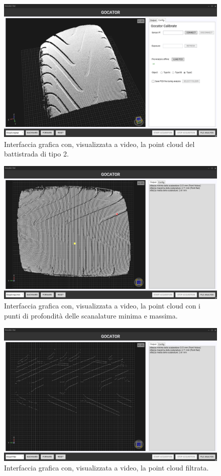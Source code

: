 \begin{figure}[H]
	\centering
	\includegraphics[width=0.9\columnwidth]{./pictures/gui_4.png}
	\caption{Interfaccia grafica con, visualizzata a video, la point cloud del battistrada di tipo 2.}\label{fig:gui_4}
\end{figure}

\begin{figure}[H]
	\centering
	\includegraphics[width=0.9\columnwidth]{./pictures/gui_5.png}
	\caption{Interfaccia grafica con, visualizzata a video, la point cloud con i punti di profondità delle scanalature minima e massima.}\label{fig:gui_5}
\end{figure}

\begin{figure}[H]
	\centering
	\includegraphics[width=0.9\columnwidth]{./pictures/gui_6.png}
	\caption{Interfaccia grafica con, visualizzata a video, la point cloud filtrata.}\label{fig:gui_6}
\end{figure}